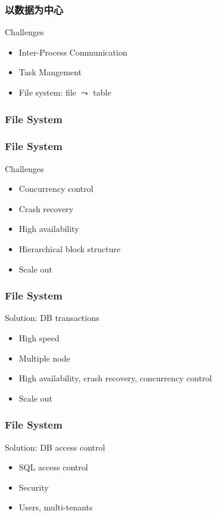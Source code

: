 \begin{frame}
\frametitle{以数据为中心}
\begin{block}{Challenges}
\begin{itemize}
	\item Inter-Process Communication
	\item Task Mangement 
	\item File system: file $\leadsto$ table
\end{itemize} 
\end{block}
\end{frame}




\subsubsection{File System}

\begin{frame}
\frametitle{File System}
\begin{block}{Challenges}
\begin{itemize}
	\item Concurrency control 
	\item Crash recovery 
	\item High availability 
	\item Hierarchical block structure 
	\item Scale out
\end{itemize} 
\end{block}
\end{frame}


\begin{frame}
\frametitle{File System}
\begin{block}{Solution: DB transactions}
\begin{itemize}
	\item High speed 
	\item Multiple node 
	\item High availability, crash recovery, concurrency control
	\item Scale out
\end{itemize} 
\end{block}
\end{frame}

\begin{frame}
\frametitle{File System}
\begin{block}{Solution: DB access control}
\begin{itemize}
	\item SQL access control 
	\item Security 
	\item Users, multi-tenants
\end{itemize} 
\end{block}
\end{frame}


